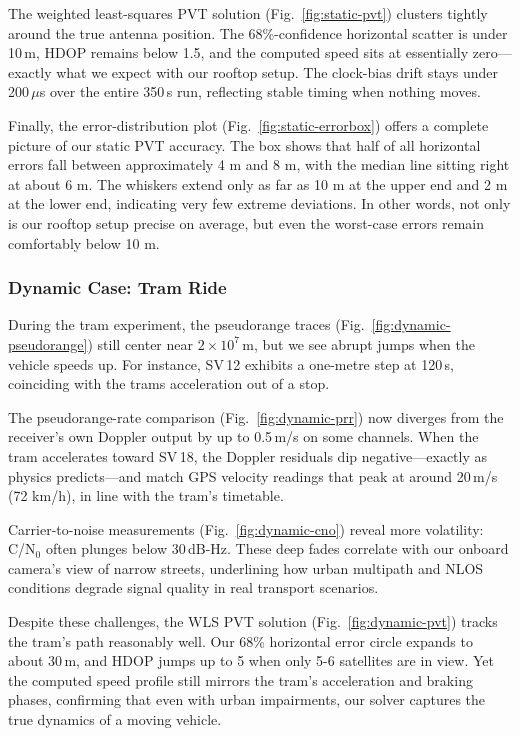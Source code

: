             The weighted least-squares PVT solution (Fig.~\ref{fig:static-pvt}) clusters tightly around the true antenna position. The 68\%-confidence horizontal scatter is under 10\,m, HDOP remains below 1.5, and the computed speed sits at essentially zero—exactly what we expect with our rooftop setup. The clock-bias drift stays under 200\,$\mu$s over the entire 350\,s run, reflecting stable timing when nothing moves.
            
            Finally, the error-distribution plot (Fig.~\ref{fig:static-errorbox}) offers a complete picture of our static PVT accuracy. The box shows that half of all horizontal errors fall between approximately 4 m and 8 m, with the median line sitting right at about 6 m. The whiskers extend only as far as 10 m at the upper end and 2 m at the lower end, indicating very few extreme deviations. In other words, not only is our rooftop setup precise on average, but even the worst-case errors remain comfortably below 10 m.

            \subsubsection{Dynamic Case: Tram Ride}
            
            During the tram experiment, the pseudorange traces (Fig.~\ref{fig:dynamic-pseudorange}) still center near $2\times10^{7}$\,m, but we see abrupt jumps when the vehicle speeds up. For instance, SV\,12 exhibits a one-metre step at 120\,s, coinciding with the trams acceleration out of a stop.
            
            The pseudorange-rate comparison (Fig.~\ref{fig:dynamic-prr}) now diverges from the receiver's own Doppler output by up to 0.5\,m/s on some channels. When the tram accelerates toward SV\,18, the Doppler residuals dip negative—exactly as physics predicts—and match GPS velocity readings that peak at around 20\,m/s (72 km/h), in line with the tram's timetable.
            
            Carrier-to-noise measurements (Fig.~\ref{fig:dynamic-cno}) reveal more volatility: C/N$_0$ often plunges below 30\,dB-Hz. These deep fades correlate with our onboard camera's view of narrow streets, underlining how urban multipath and NLOS conditions degrade signal quality in real transport scenarios.
            
            Despite these challenges, the WLS PVT solution (Fig.~\ref{fig:dynamic-pvt}) tracks the tram's path reasonably well. Our 68\% horizontal error circle expands to about 30\,m, and HDOP jumps up to 5 when only 5-6 satellites are in view. Yet the computed speed profile still mirrors the tram's acceleration and braking phases, confirming that even with urban impairments, our solver captures the true dynamics of a moving vehicle.
            
